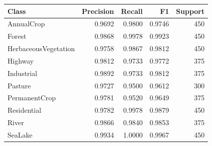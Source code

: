 \begin{tabular}{lrrrr}
\toprule
Class & Precision & Recall & F1 & Support \\
\midrule
AnnualCrop & 0.9692 & 0.9800 & 0.9746 & 450 \\
Forest & 0.9868 & 0.9978 & 0.9923 & 450 \\
HerbaceousVegetation & 0.9758 & 0.9867 & 0.9812 & 450 \\
Highway & 0.9812 & 0.9733 & 0.9772 & 375 \\
Industrial & 0.9892 & 0.9733 & 0.9812 & 375 \\
Pasture & 0.9727 & 0.9500 & 0.9612 & 300 \\
PermanentCrop & 0.9781 & 0.9520 & 0.9649 & 375 \\
Residential & 0.9782 & 0.9978 & 0.9879 & 450 \\
River & 0.9866 & 0.9840 & 0.9853 & 375 \\
SeaLake & 0.9934 & 1.0000 & 0.9967 & 450 \\
\bottomrule
\end{tabular}
